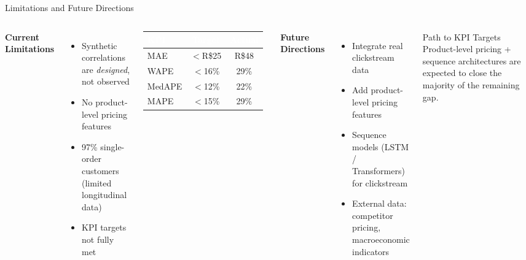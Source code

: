 \documentclass[aspectratio=169,10pt]{beamer}
\begin{document}
\begin{frame}{Limitations and Future Directions}
  \begin{columns}[T]
    \textbf{Current Limitations}
    \begin{itemize}
      \item Synthetic correlations are \emph{designed}, not observed
      \item No product-level pricing features
      \item 97\% single-order customers (limited longitudinal data)
      \item KPI targets not fully met
    \end{itemize}

    \vspace{8pt}
    \small
    \begin{tabular}{lcc}
      \toprule
      \rowcolor{brandcolor}
      \textcolor{white}{\textbf{KPI}} & \textcolor{white}{\textbf{Target}} & \textcolor{white}{\textbf{Actual}} \\
      \midrule
      MAE    & $<$R\$25 & R\$48 \\
      WAPE   & $<$16\%  & 29\% \\
      MedAPE & $<$12\%  & 22\% \\
      MAPE   & $<$15\%  & 29\% \\
      \bottomrule
    \end{tabular}

    \textbf{Future Directions}
    \begin{itemize}
      \item Integrate real clickstream data
      \item Add product-level pricing features
      \item Sequence models (LSTM / Transformers) for clickstream
      \item External data: competitor pricing, macroeconomic indicators
    \end{itemize}

    \vspace{8pt}
    \begin{block}{Path to KPI Targets}
      Product-level pricing + sequence architectures are expected to
      close the majority of the remaining gap.
      
    \end{block}
  \end{columns}
\end{frame}
\end{document}
